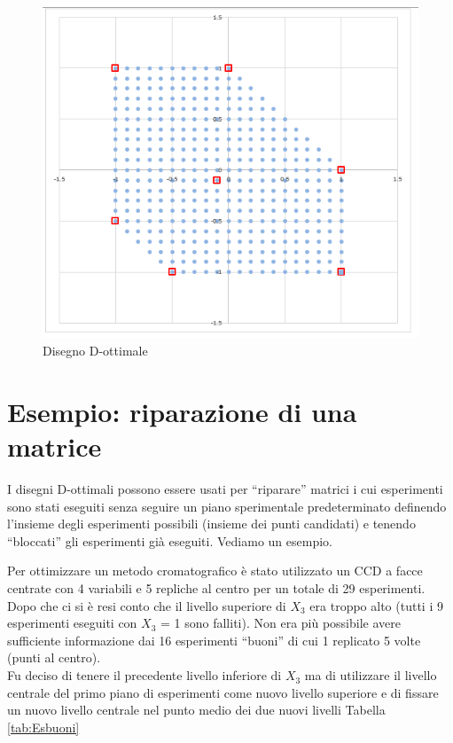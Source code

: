\documentclass[
  11pt,
]{book}
\begin{document}
\begin{figure}[ht]

{\centering \includegraphics[width=1\linewidth]{Immagini/D_opt/07_es1_pticandidati} 

}

\caption{Disegno D-ottimale}\label{fig:fig7}
\end{figure}

\hypertarget{esempio-riparazione-di-una-matrice}{%
\section{Esempio: riparazione di una matrice}\label{esempio-riparazione-di-una-matrice}}

I disegni D-ottimali possono essere usati per ``riparare'' matrici i cui esperimenti sono stati eseguiti senza seguire un piano sperimentale predeterminato
definendo l'insieme degli esperimenti possibili (insieme dei punti candidati) e tenendo ``bloccati'' gli esperimenti già eseguiti.
Vediamo un esempio.

Per ottimizzare un metodo cromatografico \citep{r.leardi2018} è stato utilizzato un CCD a facce centrate con 4 variabili e 5 repliche al centro per un totale di 29 esperimenti.
Dopo che ci si è resi conto che il livello superiore di \(X_3\) era troppo alto (tutti i 9 esperimenti eseguiti con \(X_3\) = 1 sono falliti). Non era più possibile avere sufficiente informazione dai 16 esperimenti ``buoni'' di cui 1 replicato 5 volte (punti al centro).\\
Fu deciso di tenere il precedente livello inferiore di \(X_3\) ma di utilizzare il livello centrale del primo piano di esperimenti come nuovo livello superiore e di fissare un nuovo livello centrale nel punto medio dei due nuovi livelli Tabella \ref{tab:Esbuoni}
\end{document}
